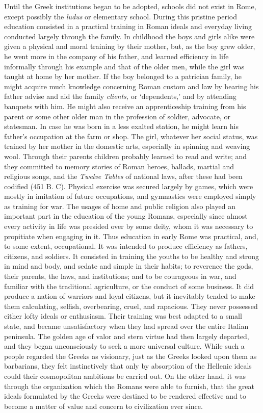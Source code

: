 \documentclass[
]{book}
\begin{document}
Until the Greek institutions began to be adopted, schools did not exist in Rome, except possibly the \emph{ludus} or elementary school. During this pristine period education consisted in a practical training in Roman ideals and everyday living conducted largely through the family. In childhood the boys and girls alike were given a physical and moral training by their mother, but, as the boy grew older, he went more in the company of his father, and learned efficiency in life informally through his example and that of the older men, while the girl was taught at home by her mother. If the boy belonged to a patrician family, he might acquire much knowledge concerning Roman custom and law by hearing his father advise and aid the family \emph{clients,} or `dependents,' and by attending banquets with him. He might also receive an apprenticeship training from his parent or some other older man in the profession of soldier, advocate, or statesman. In case he was born in a less exalted station, he might learn his father's occupation at the farm or shop. The girl, whatever her social status, was trained by her mother in the domestic arts, especially in spinning and weaving wool. Through their parents children probably learned to read and write; and they committed to memory stories of Roman heroes, ballads, martial and religious songs, and the \emph{Twelve Tables} of national laws, after these had been codified (451 B. C). Physical exercise was secured largely by games, which were mostly in imitation of future occupations, and gymnastics were employed simply as training for war. The usages of home and public religion also played an important part in the education of the young Romans, especially since almost every activity in life was presided over by some deity, whom it was necessary to propitiate when engaging in it. Thus education in early Rome was practical, and, to some extent, occupational. It was intended to produce efficiency as fathers, citizens, and soldiers. It consisted in training the youths to be healthy and strong in mind and body, and sedate and simple in their habits; to reverence the gods, their parents, the laws, and institutions; and to be courageous in war, and familiar with the traditional agriculture, or the conduct of some business. It did produce a nation of warriors and loyal citizens, but it inevitably tended to make them calculating, selfish, overbearing, cruel, and rapacious. They never possessed either lofty ideals or enthusiasm. Their training was best adapted to a small state, and became unsatisfactory when they had spread over the entire Italian peninsula. The golden age of valor and stern virtue had then largely departed, and they began unconsciously to seek a more universal culture. While such a people regarded the Greeks as visionary, just as the Greeks looked upon them as barbarians, they felt instinctively that only by absorption of the Hellenic ideals could their cosmopolitan ambitions be carried out. On the other hand, it was through the organization which the Romans were able to furnish, that the great ideals formulated by the Greeks were destined to be rendered effective and to become a matter of value and concern to civilization ever since.
\end{document}
